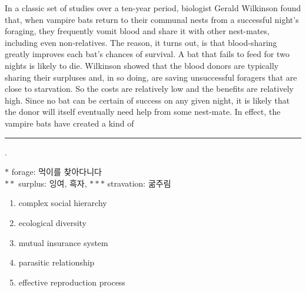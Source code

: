 \documentclass[9pt, a4paper, twocolumn]{oblivoir}
\begin{document}
\begin{enumerate}
In a classic set of studies over a ten-year period, biologist
Gerald Wilkinson found that, when vampire bats return to
their communal nests from a successful night’s foraging, they
frequently vomit blood and share it with other nest-mates,
including even non-relatives. The reason, it turns out, is that
blood-sharing greatly improves each bat’s chances of survival.
A bat that fails to feed for two nights is likely to die.
Wilkinson showed that the blood donors are typically sharing
their surpluses and, in so doing, are saving unsuccessful
foragers that are close to starvation. So the costs are
relatively low and the benefits are relatively high. Since no
bat can be certain of success on any given night, it is likely
that the donor will itself eventually need help from some
nest-mate. In effect, the vampire bats have created a kind
of \rule{3.5cm}{0.1mm}. 
\begin{flushright}
    {\small $*$ forage: 먹이를 찾아다니다 \\ $**$ surplus: 잉여, 흑자, $***$ stravation: 굶주림}
\end{flushright}

    \begin{enumerate}
        \item complex social hierarchy
        \item ecological diversity
        \item mutual insurance system %
        \item parasitic relationship
        \item effective reproduction process
    \end{enumerate}

    \end{enumerate}
    
\end{document}
